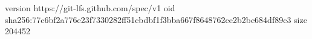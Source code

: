 version https://git-lfs.github.com/spec/v1
oid sha256:77c6bf2a776e23f7330282ff51cbdbf1f3bba667f8648762ce2b2bc684df89c3
size 204452
